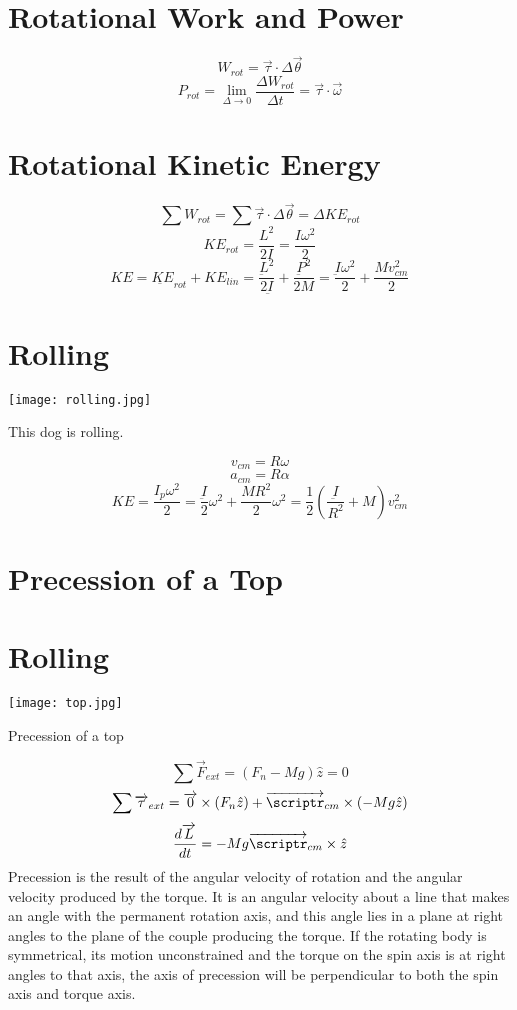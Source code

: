   \section{Rotational Work and Power}
 $$W_{rot}= \overrightarrow{\tau}\cdot \Delta \overrightarrow{\theta}$$
 $$P_{rot}=\lim_{\Delta\rightarrow 0}\frac{\Delta W_{rot}}{\Delta t}=\overrightarrow{\tau}\cdot \overrightarrow{\omega}$$

 
 \section{Rotational Kinetic Energy}
 $$\sum W_{rot}=\sum \overrightarrow{\tau}\cdot \Delta\overrightarrow{\theta}=\Delta KE_{rot}$$
 $$KE_{rot}=\frac{L^2}{2I}=\frac{I\omega^2}{2}$$
 $$KE=\underbar{KE}_{rot}+KE_{lin}=\frac{\underbar{L}^2}{2\underbar{I}}+\frac{\underbar{P}^2}{2M}=\frac{\underbar{I}\omega^2}{2}+\frac{Mv_{cm}^2}{2}$$

 \section{Rolling}
 \begin{marginfigure}[10pt]
  \texttt{[image: rolling.jpg]}
  \caption{This dog is rolling.}
  \label{fig:marginfig}
\end{marginfigure}
 $$v_{cm}=R\omega$$
 $$a_{cm}=R\alpha$$
 $$KE=\frac{I_p\omega^2}{2}=\frac{\underbar I}{2}\omega^2+\frac{MR^2}{2}\omega^2=\frac{1}{2}\left(\frac{\underbar I}{R^2}+M\right)v_{cm}^2$$
 \section{Precession of a Top}
  \section{Rolling}
 \begin{marginfigure}[10pt]
  \texttt{[image: top.jpg]}
  \caption{Precession of a top}
  \label{fig:marginfig}
\end{marginfigure}
 $$\sum{ \overrightarrow{F}_{ext}}=(F_n-Mg)\hat{z}=0$$
 $$\sum{ \overrightarrow{\tau}_{ext}}=\overrightarrow{0}\times(F_n\hat{z})+\overrightarrow{\scriptr}_{cm}\times(-Mg\hat{z})$$
 $$\frac{d\overrightarrow{L}}{dt}=-Mg\overrightarrow{\scriptr}_{cm}\times\hat{z}$$
 Precession is the result of the angular velocity of rotation and the angular velocity produced by the torque. It is an angular velocity about a line that makes an angle with the permanent rotation axis, and this angle lies in a plane at right angles to the plane of the couple producing the torque.  If the rotating body is symmetrical, its motion unconstrained and the torque on the spin axis is at right angles to that axis, the axis of precession will be perpendicular to both the spin axis and torque axis.

